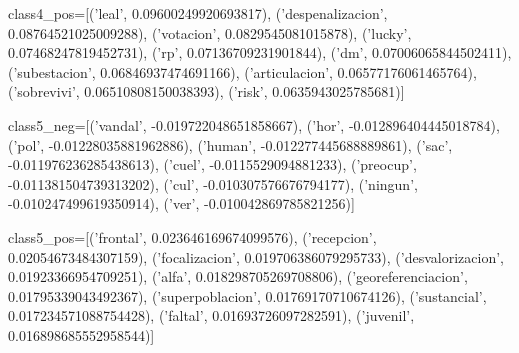  class4_pos=[('leal', 0.09600249920693817),
 ('despenalizacion', 0.08764521025009288),
 ('votacion', 0.0829545081015878),
 ('lucky', 0.07468247819452731),
 ('rp', 0.07136709231901844),
 ('dm', 0.07006065844502411),
 ('subestacion', 0.06846937474691166),
 ('articulacion', 0.06577176061465764),
 ('sobrevivi', 0.06510808150038393),
 ('risk', 0.0635943025785681)]
 
 class5_neg=[('vandal', -0.019722048651858667),
 ('hor', -0.012896404445018784),
 ('pol', -0.01228035881962886),
 ('human', -0.012277445688889861),
 ('sac', -0.011976236285438613),
 ('cuel', -0.0115529094881233),
 ('preocup', -0.011381504739313202),
 ('cul', -0.010307576676794177),
 ('ningun', -0.010247499619350914),
 ('ver', -0.010042869785821256)]
 
 class5_pos=[('frontal', 0.023646169674099576),
 ('recepcion', 0.02054673484307159),
 ('focalizacion', 0.019706386079295733),
 ('desvalorizacion', 0.01923366954709251),
 ('alfa', 0.018298705269708806),
 ('georeferenciacion', 0.01795339043492367),
 ('superpoblacion', 0.01769170710674126),
 ('sustancial', 0.017234571088754428),
 ('faltal', 0.01693726097282591),
 ('juvenil', 0.016898685552958544)]